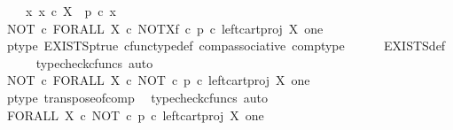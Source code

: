 \begin{isabellebody}
\ \ \ {\isachardoublequoteopen}{\isasymexists}\ x{\isachardot}{\kern0pt}\ x\ {\isasymin}\isactrlsub c\ X\ {\isasymand}\ p\ {\isasymcirc}\isactrlsub c\ x\ {\isacharequal}{\kern0pt}\ {\isasymt}{\isachardoublequoteclose}\isanewline
%
\isadelimproof
%
\endisadelimproof
%
\isatagproof
{}\isamarkupfalse%
\ {\isacharminus}{\kern0pt}\isanewline
\ \ \isamarkupfalse%
\ {\isachardoublequoteopen}NOT\ {\isasymcirc}\isactrlsub c\ FORALL\ X\ {\isasymcirc}\isactrlsub c\ NOT\isactrlbsup X\isactrlesup \isactrlsub f\ {\isasymcirc}\isactrlsub c\ {\isacharparenleft}{\kern0pt}p\ {\isasymcirc}\isactrlsub c\ left{\isacharunderscore}{\kern0pt}cart{\isacharunderscore}{\kern0pt}proj\ X\ one{\isacharparenright}{\kern0pt}\isactrlsup {\isasymsharp}\ {\isacharequal}{\kern0pt}\ {\isasymt}{\isachardoublequoteclose}\isanewline
\ \ \ \ \isamarkupfalse%
\ p{\isacharunderscore}{\kern0pt}type\ EXISTS{\isacharunderscore}{\kern0pt}p{\isacharunderscore}{\kern0pt}true\ cfunc{\isacharunderscore}{\kern0pt}type{\isacharunderscore}{\kern0pt}def\ comp{\isacharunderscore}{\kern0pt}associative\ comp{\isacharunderscore}{\kern0pt}type\isanewline
\ \ \ \ \isamarkupfalse%
\ EXISTS{\isacharunderscore}{\kern0pt}def\isanewline
\ \ \ \ \isamarkupfalse%
\ {\isacharparenleft}{\kern0pt}typecheck{\isacharunderscore}{\kern0pt}cfuncs{\isacharcomma}{\kern0pt}\ auto{\isacharparenright}{\kern0pt}\isanewline
\ \ \isamarkupfalse%
\ \isamarkupfalse%
\ {\isachardoublequoteopen}NOT\ {\isasymcirc}\isactrlsub c\ FORALL\ X\ {\isasymcirc}\isactrlsub c\ {\isacharparenleft}{\kern0pt}NOT\ {\isasymcirc}\isactrlsub c\ p\ {\isasymcirc}\isactrlsub c\ left{\isacharunderscore}{\kern0pt}cart{\isacharunderscore}{\kern0pt}proj\ X\ one{\isacharparenright}{\kern0pt}\isactrlsup {\isasymsharp}\ {\isacharequal}{\kern0pt}\ {\isasymt}{\isachardoublequoteclose}\isanewline
\ \ \ \ \isamarkupfalse%
\ p{\isacharunderscore}{\kern0pt}type\ transpose{\isacharunderscore}{\kern0pt}of{\isacharunderscore}{\kern0pt}comp\ \isamarkupfalse%
\ {\isacharparenleft}{\kern0pt}typecheck{\isacharunderscore}{\kern0pt}cfuncs{\isacharcomma}{\kern0pt}\ auto{\isacharparenright}{\kern0pt}\isanewline
\ \ \isamarkupfalse%
\ \isamarkupfalse%
\ {\isachardoublequoteopen}FORALL\ X\ {\isasymcirc}\isactrlsub c\ {\isacharparenleft}{\kern0pt}NOT\ {\isasymcirc}\isactrlsub c\ p\ {\isasymcirc}\isactrlsub c\ left{\isacharunderscore}{\kern0pt}cart{\isacharunderscore}{\kern0pt}proj\ X\ one{\isacharparenright}{\kern0pt}\isactrlsup {\isasymsharp}\ {\isasymnoteq}\ {\isasymt}{\isachardoublequoteclose}\isanewline

\end{isabellebody}
